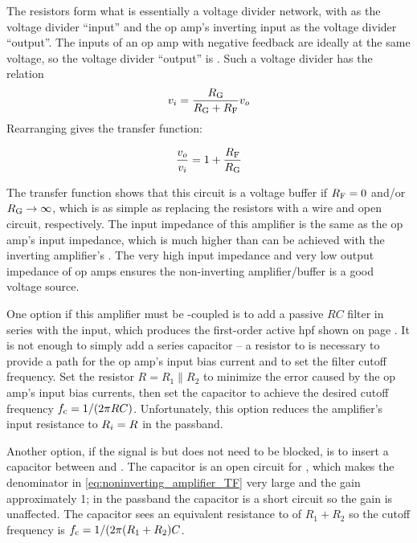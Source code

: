 The resistors form what is essentially a voltage divider network, with \vout as the voltage divider ``input'' and the op amp's inverting input as the voltage divider ``output''.
The inputs of an op amp with negative feedback are ideally at the same voltage, so the voltage divider ``output'' is \vin.
Such a voltage divider has the relation \[\vin = \frac{\R[G]}{\R[G] + \R[F]}\vout\]
Rearranging gives the transfer function:

\begin{equation}
	\frac{\vout}{\vin} = 1+\frac{\R[F]}{\R[G]}
	\label{eq:noninverting_amplifier_TF}
\end{equation}

The transfer function shows that this circuit is a voltage buffer if \(\R[F] = 0\) and/or \(\R[G] \to \infty\), which is as simple as replacing the resistors with a wire and open circuit, respectively.
The input impedance of this amplifier is the same as the op amp's input impedance, which is much higher than can be achieved with the inverting amplifier's \rin.
The very high input impedance and very low output impedance of op amps ensures the non-inverting amplifier/buffer is a good voltage source.

One option if this amplifier must be \AC-coupled is to add a passive \(RC\) filter in series with the input, which produces the first-order active \ac{hpf} shown on page \pageref{sec:active1storderHPF}.
It is not enough to simply add a series capacitor -- a resistor to \gnd is necessary to provide a \DC path for the op amp's input bias current and to set the filter cutoff frequency.
Set the resistor \(R = R_1 \parallel R_2\) to minimize the error caused by the op amp's input bias currents, then set the capacitor \C to achieve the desired cutoff frequency \(f_\mathrm{c} = 1/(2\pi R C)\).
Unfortunately, this option reduces the amplifier's input resistance to \(R_i = R\) in the passband.

Another option, if the signal is \AC but \DC does not need to be blocked, is to insert a capacitor \C between \R[1] and \gnd.
The capacitor is an open circuit for \DC, which makes the denominator in \eqref{eq:noninverting_amplifier_TF} very large and the \DC gain approximately 1;
in the passband the capacitor is a short circuit so the gain is unaffected.
The capacitor sees an equivalent resistance to \gnd of \(R_1 + R_2\) so the cutoff frequency is \(f_\mathrm{c} = 1/(2\pi(R_1 + R_2)C\).

